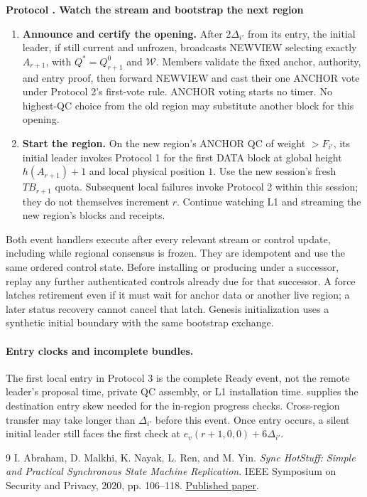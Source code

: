 \documentclass[11pt,a4paper]{article}
\newcounter{protocol}
\newenvironment{protocol}[2]{\refstepcounter{protocol}\label{#1}
\begin{mdframed}[nobreak=true,linewidth=.6pt,skipabove=8pt,skipbelow=8pt,
innertopmargin=7pt,innerbottommargin=7pt]\small
\textbf{Protocol \theprotocol. #2}\par\smallskip}{\end{mdframed}}
\begin{document}
\begin{protocol}{alg:bootstrap}{Watch the stream and bootstrap the next region}
\begin{enumerate}[label=\textbf{\arabic*)},itemsep=5pt]
\item \textbf{Announce and certify the opening.} After $2\Delta_{i'}$
from its entry, the initial leader, if still current and unfrozen,
broadcasts NEWVIEW selecting exactly $A_{r+1}$, with
$Q^*=Q_{r+1}^0$ and $\mathcal W$.
Members validate the fixed anchor, authority, and entry proof, then forward
NEWVIEW and cast their one ANCHOR vote under Protocol 2's first-vote rule.
ANCHOR voting starts no timer. No highest-QC choice from the old region
may substitute another block for this opening.

\item \textbf{Start the region.} On the new region's ANCHOR QC of weight
$>F_{i'}$, its initial leader invokes Protocol 1 for the first DATA block
at global height $h(A_{r+1})+1$ and local physical position $1$.
Use the new session's fresh $TB_{r+1}$ quota. Subsequent local failures
invoke Protocol 2 within this session; they do not themselves increment $r$.
Continue watching L1 and streaming the new region's blocks and receipts.
\end{enumerate}
\end{protocol}

Both event handlers execute after every relevant stream or control update,
including while regional consensus is frozen. They are idempotent and use
the same ordered control state. Before installing or producing under a
successor, replay any further authenticated controls already due for that
successor. A force latches retirement even if it must wait for anchor data
or another live region; a later status recovery cannot cancel that latch.
Genesis initialization uses a synthetic initial boundary with the same
bootstrap exchange.

\paragraph{Entry clocks and incomplete bundles.}
The first local entry in Protocol 3 is the complete Ready event, not the
remote leader's proposal time, private QC assembly, or L1 installation
time.  supplies the destination entry skew needed for the
in-region progress checks. Cross-region transfer may take longer than
$\Delta_{i'}$ before this event. Once entry occurs, a silent initial leader
still faces the first check at $e_v(r+1,0,0)+6\Delta_{i'}$.

\begin{thebibliography}{9}
I. Abraham, D. Malkhi, K. Nayak, L. Ren, and M. Yin.
\emph{Sync HotStuff: Simple and Practical Synchronous State Machine Replication}.
IEEE Symposium on Security and Privacy, 2020, pp. 106--118.
\href{https://conferences.computer.org/sp/pdfs/sp/2020/349700a106.pdf}{Published paper}.
\end{thebibliography}
\end{document}
